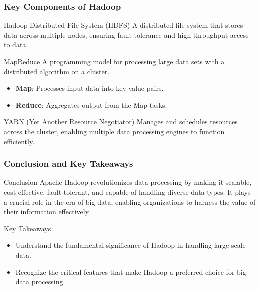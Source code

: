 \documentclass{beamer}
\begin{document}
\begin{frame}[fragile]
    \frametitle{Key Components of Hadoop}
    \begin{block}{Hadoop Distributed File System (HDFS)}
        A distributed file system that stores data across multiple nodes, ensuring fault tolerance and high throughput access to data.
    \end{block}

    \begin{block}{MapReduce}
        A programming model for processing large data sets with a distributed algorithm on a cluster. 
        \begin{itemize}
            \item \textbf{Map}: Processes input data into key-value pairs.
            \item \textbf{Reduce}: Aggregates output from the Map tasks.
        \end{itemize}
    \end{block}

    \begin{block}{YARN (Yet Another Resource Negotiator)}
        Manages and schedules resources across the cluster, enabling multiple data processing engines to function efficiently.
    \end{block}
\end{frame}

\begin{frame}[fragile]
    \frametitle{Conclusion and Key Takeaways}
    \begin{block}{Conclusion}
        Apache Hadoop revolutionizes data processing by making it scalable, cost-effective, fault-tolerant, and capable of handling diverse data types. 
        It plays a crucial role in the era of big data, enabling organizations to harness the value of their information effectively.
    \end{block}

    \begin{block}{Key Takeaways}
        \begin{itemize}
            \item Understand the fundamental significance of Hadoop in handling large-scale data.
            \item Recognize the critical features that make Hadoop a preferred choice for big data processing.
        \end{itemize}
    \end{block}
\end{frame}
\end{document}
